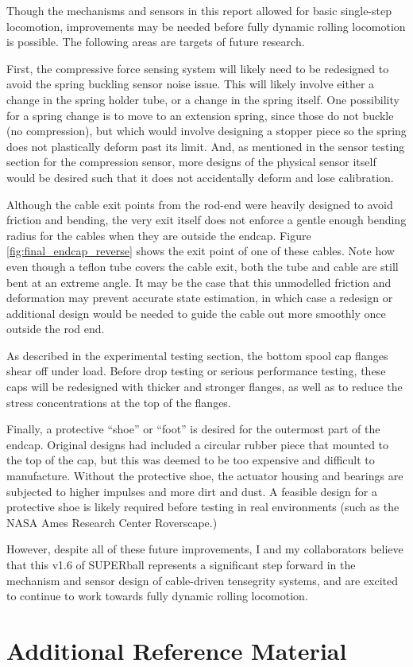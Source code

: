 \documentclass[12pt]{report}
\begin{document}
Though the mechanisms and sensors in this report allowed for basic single-step locomotion, improvements may be needed before fully dynamic rolling locomotion is possible. 
The following areas are targets of future research.

First, the compressive force sensing system will likely need to be redesigned to avoid the spring buckling sensor noise issue.
This will likely involve either a change in the spring holder tube, or a change in the spring itself.
One possibility for a spring change is to move to an extension spring, since those do not buckle (no compression), but which would involve designing a stopper piece so the spring does not plastically deform past its limit.
And, as mentioned in the sensor testing section for the compression sensor, more designs of the physical sensor itself would be desired such that it does not accidentally deform and lose calibration.

Although the cable exit points from the rod-end were heavily designed to avoid friction and bending, the very exit itself does not enforce a gentle enough bending radius for the cables when they are outside the endcap.
Figure \ref{fig:final_endcap_reverse} shows the exit point of one of these cables.
Note how even though a teflon tube covers the cable exit, both the tube and cable are still bent at an extreme angle.
It may be the case that this unmodelled friction and deformation may prevent accurate state estimation, in which case a redesign or additional design would be needed to guide the cable out more smoothly once outside the rod end.

As described in the experimental testing section, the bottom spool cap flanges shear off under load.
Before drop testing or serious performance testing, these caps will be redesigned with thicker and stronger flanges, as well as to reduce the stress concentrations at the top of the flanges.

Finally, a protective ``shoe'' or ``foot'' is desired for the outermost part of the endcap.
Original designs had included a circular rubber piece that mounted to the top of the cap, but this was deemed to be too expensive and difficult to manufacture.
Without the protective shoe, the actuator housing and bearings are subjected to higher impulses and more dirt and dust.
A feasible design for a protective shoe is likely required before testing in real environments (such as the NASA Ames Research Center Roverscape.)

However, despite all of these future improvements, I and my collaborators believe that this v1.6 of SUPERball represents a significant step forward in the mechanism and sensor design of cable-driven tensegrity systems, and are excited to continue to work towards fully dynamic rolling locomotion.


\appendix
\chapter{Additional Reference Material}




\end{document}
